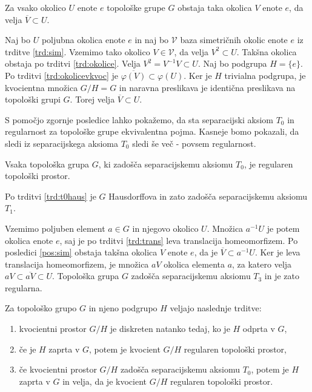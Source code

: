 \documentclass[mat1]{fmfdelo}
\newcommand{\closure}[1]{\overline{#1}}
\begin{document}
\begin{posledica}\label{pos:sim}
Za vsako okolico $U$ enote $e$ topološke grupe $G$ obstaja taka okolica $V$ enote $e$, da velja $\closure{V} \subset U$.
\end{posledica}

\begin{dokaz}
Naj bo $U$ poljubna okolica enote $e$ in naj bo $\mathcal{V}$ baza simetričnih okolic enote $e$ iz trditve \ref{trd:sim}. Vzemimo tako okolico $V \in \mathcal{V}$, da velja $V^2 \subset U$. Takšna okolica obstaja po trditvi \ref{trd:okolice}. Velja $V^2 = V^{-1}V \subset U$. Naj bo podgrupa $H = \lbrace e \rbrace$. Po trditvi \ref{trd:okolicevkvoc} je $\closure{\varphi(V)} \subset \varphi(U)$. Ker je $H$ trivialna podgrupa, je kvocientna množica $G/H = G$ in naravna preslikava je identična preslikava na topološki grupi $G$. Torej velja $\closure{V} \subset U$.
\end{dokaz}

S pomočjo zgornje posledice lahko pokažemo, da sta separacijski aksiom $T_0$ in regularnost za topološke grupe ekvivalentna pojma. Kasneje bomo pokazali, da sledi iz separacijskega aksioma $T_0$ sledi še več - povsem regularnost.

\begin{izrek}\label{izr:t3}
	Vsaka topološka grupa $G$, ki zadošča separacijskemu aksiomu $T_0$, je regularen topološki prostor.
\end{izrek}

\begin{dokaz}
	Po trditvi \ref{trd:t0haus} je $G$ Hausdorffova in zato zadošča separacijskemu aksiomu $T_1$.
	
	Vzemimo poljuben element $a \in G$ in njegovo okolico $U$. Množica $a^{-1}U$ je potem okolica enote $e$, saj je po trditvi \ref{trd:trans} leva translacija homeomorfizem. Po posledici \ref{pos:sim} obstaja takšna okolica $V$ enote $e$, da je $\closure{V} \subset a^{-1}U$. Ker je leva translacija homeomorfizem, je množica $aV$ okolica elementa $a$, za katero velja $aV \subset \closure{aV} \subset U$. Topološka grupa $G$ zadošča separacijskemu aksiomu $T_3$ in je zato regularna.
\end{dokaz}

\begin{izrek}\label{izr:kvocreg}
Za topološko grupo $G$ in njeno podgrupo $H$ veljajo naslednje trditve:
\begin{enumerate}
\item kvocientni prostor $G/H$ je diskreten natanko tedaj, ko je $H$ odprta v $G$,\label{podtrd:kvocreg1}
\item če je $H$ zaprta v $G$, potem je kvocient $G/H$ regularen topološki prostor,\label{podtrd:kvocreg2}
\item če kvocientni prostor $G/H$ zadošča separacijskemu aksiomu $T_0$, potem je $H$ zaprta v $G$ in velja, da je kvocient $G/H$ regularen topološki prostor.\label{podtrd:kvocreg3}
\end{enumerate}
\end{izrek}
\end{document}
